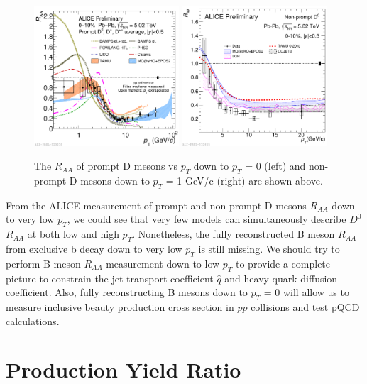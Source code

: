 \begin{figure}[hbtp]
\begin{center}
\includegraphics[width=0.48\textwidth]{Figures/Chapter2/ALICEDRAALow.pdf}
\includegraphics[width=0.48\textwidth]{Figures/Chapter2/ALICENPDRAALow.pdf}
\caption{The $R_{AA}$ of prompt D mesons vs $p_T$ down to $p_T$ = 0 (left) and non-prompt D mesons down to $p_T$ = 1 GeV/c (right) are shown above.}
\label{ALICEDRAALow}
\end{center}
\end{figure}   

From the ALICE measurement of prompt and non-prompt D mesons $R_{AA}$ down to very low $p_T$, we could see that very few models can simultaneously describe $D^0$ $R_{AA}$ at both low and high $p_T$. Nonetheless, the fully reconstructed B meson $R_{AA}$ from exclusive b decay down to very low $p_T$ is still missing. We should try to perform B meson $R_{AA}$ measurement down to low $p_T$ to provide a complete picture to constrain the jet transport coefficient $\hat q$ and heavy quark diffusion coefficient. Also, fully reconstructing B mesons down to $p_T$ = 0 will allow us to measure inclusive beauty production cross section in $pp$ collisions and test pQCD calculations.  


\section{Production Yield Ratio}

